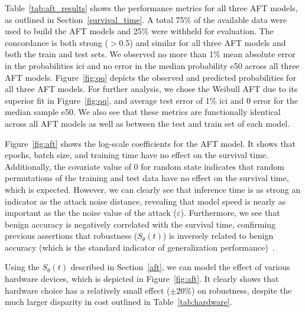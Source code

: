\documentclass[sn-mathphys-num]{sn-jnl}%
\begin{document}
Table~\ref{tab:aft_results} shows the performance metrics for all three AFT models, as outlined in Section~\ref{survival_time}. A total 75\% of the available data were used to build the AFT models and 25\% were withheld for evaluation. The concordance is both strong ($>0.5$) and similar for all three AFT models and both the train and test sets. We observed no more than 1\% mean absolute error in the probabilities \acrshort{ici} and no error in the median probability \acrshort{e50} across all three AFT models. Figure~\ref{fig:qq} depicts the observed and predicted probabilities for all three AFT models. For further analysis, we chose the Weibull AFT due to its superior fit in Figure~\ref{fig:qq}, and average test error of 1\% \acrshort{ici} and 0 error for the median sample \acrshort{e50}. We also see that these metrics are  functionally identical across all AFT models as well as between the test and train set of each model.

Figure~\ref{fig:aft} shows the log-scale coefficients for the AFT model. It shows that epochs, batch size, and training time have no effect on the survival time.
Additionally, the covariate value of 0 for random state indicates that random permutations of the training and test data have no effect on the survival time, which is expected.
However, we can clearly see that inference time  is as strong an indicator as the attack noise distance, revealing that model speed is nearly as important as the the noise value of the attack ($\varepsilon$).
Furthermore, we see that benign accuracy is negatively correlated with the survival time, confirming previous assertions that robustness ($S_{\theta}(t)$) is inversely related to benign accuracy (which is the standard indicator of generalization performance)~\cite{carlini_towards_2017}.

Using the $S_{\theta}(t)$ described in Section~\ref{aft}, we can model the effect of various hardware devices, which is depicted in Figure~\ref{fig:aft}.
It clearly shows that hardware choice has a relatively small effect ($\pm 20\%$) on robustness, despite the much larger disparity in cost outlined in Table~\ref{tab:hardware}.
\end{document}

